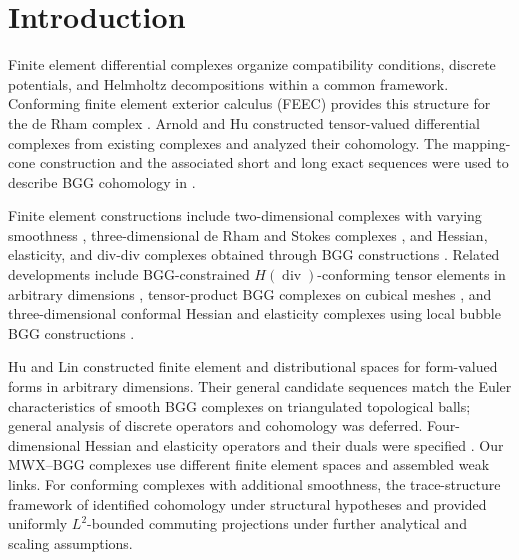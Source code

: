 \documentclass[10pt]{amsart}
\numberwithin{equation}{section}
\renewcommand{\div}{\operatorname{div}}
\begin{document}
 
\maketitle




\section{Introduction}
Finite element differential complexes organize compatibility conditions,
discrete potentials, and Helmholtz decompositions within a common framework.
Conforming finite element exterior calculus (FEEC) provides this structure
for the de Rham complex
\cite{Arnold2018,ArnoldFalkWinther2006,ArnoldFalkWinther2010}.
Arnold and Hu \cite{ArnoldHu2021} constructed tensor-valued differential
complexes from existing complexes and analyzed their cohomology.
The mapping-cone construction and the associated short and long exact
sequences were used to describe BGG cohomology in
\cite{Christiansen2026BGG}.

Finite element constructions include two-dimensional complexes with
varying smoothness \cite{ChenHuang2024a}, three-dimensional
de Rham and Stokes complexes \cite{ChenHuang2024}, and Hessian,
elasticity, and div-div complexes obtained through BGG constructions
\cite{ChenHuangBGG2026}.
Related developments include BGG-constrained $H(\div)$-conforming tensor
elements in arbitrary dimensions
\cite{ChenHuang2024Constraints}, tensor-product BGG complexes on cubical
meshes \cite{BonizzoniHuKanschatSap2025}, and three-dimensional conformal
Hessian and elasticity complexes using local bubble BGG constructions
\cite{Huang2025Conformal}.

Hu and Lin \cite[Sections~1 and~5.3]{HuLin2025} constructed finite element
and distributional spaces for form-valued forms in arbitrary dimensions.
Their general candidate sequences match the Euler characteristics of
smooth BGG complexes on triangulated topological balls; general analysis
of discrete operators and cohomology was deferred.
Four-dimensional Hessian and elasticity operators and their duals were
specified \cite[Remark~5.2]{HuLin2025}.
Our MWX--BGG complexes use different finite element spaces and assembled
weak links.
For conforming complexes with additional smoothness, the trace-structure
framework of \cite[Theorems~2.1--2.3]{HuLiangLin2025} identified cohomology
under structural hypotheses and provided uniformly $L^2$-bounded commuting
projections under further analytical and scaling assumptions.
\end{document}
